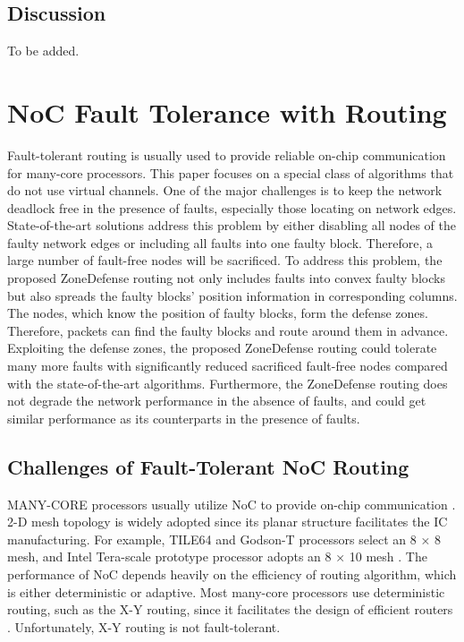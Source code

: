 \subsection{Discussion}
To be added.

\section{NoC Fault Tolerance with Routing}
Fault-tolerant routing is usually used to provide reliable on-chip communication for many-core processors. This paper focuses on a special class of algorithms that do not use virtual channels. One of the major challenges is to keep the network deadlock free in the presence of faults, especially those locating on network edges. State-of-the-art solutions address this problem by either disabling all nodes of the faulty network edges or including all faults into one faulty block. Therefore, a large number of fault-free nodes will be sacrificed. To address this problem, the proposed ZoneDefense routing not only includes faults into convex faulty blocks but also spreads the faulty blocks’ position information in corresponding columns. The nodes, which know the position of faulty blocks, form the defense zones. Therefore, packets can find the faulty blocks and route around them in advance. Exploiting the defense zones, the proposed ZoneDefense routing could tolerate many more faults with significantly reduced sacrificed fault-free nodes compared with the state-of-the-art algorithms. Furthermore, the ZoneDefense routing does not degrade the network performance in the absence of faults, and could get similar performance as its counterparts in the presence of faults.

\subsection{Challenges of Fault-Tolerant NoC Routing}
MANY-CORE processors usually utilize NoC to provide on-chip communication \cite{dally2004principles}. 2-D mesh topology is widely adopted since its planar structure facilitates the IC manufacturing. For example, TILE64 \cite{bell2008tile64} and Godson-T \cite{fan2009godson} processors select an 8 × 8 mesh, and Intel Tera-scale prototype processor adopts an 8 × 10 mesh \cite{vangal200880}. The performance of NoC depends heavily on the efficiency of routing algorithm, which is either deterministic or adaptive. Most many-core processors use deterministic routing, such as the X-Y routing, since it facilitates the design of efficient routers \cite{bell2008tile64} \cite{fan2009godson} \cite{vangal200880}. Unfortunately, X-Y routing is not fault-tolerant.

